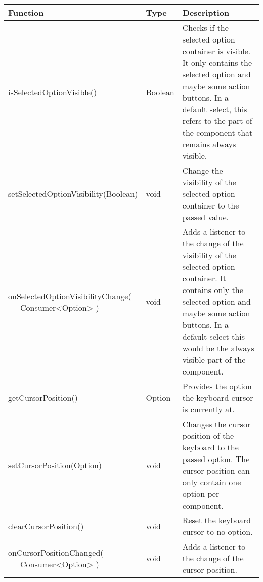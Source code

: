 \clearpage
\begin{table}[!htb] 
    \label{api:selectControllerReturn2}
    \scriptsize
    \setlength\extrarowheight{4pt}
    \begin{tabular}{ p{5cm} p{2.3cm} p{5.2cm} }
        \toprule[0.5pt]
        \textbf{Function}                    & \textbf{Type}          & \textbf{Description} \\
        \midrule    
        isSelectedOptionVisible()            & Boolean                & Checks if the selected option container is visible. 
                                                                        It only contains the selected option and maybe some action buttons.
        In a default select, this refers to the part of the component that remains always visible. \\
        setSelectedOptionVisibility(Boolean) & void                   & Change the visibility of the selected option container to the passed value. \\
        \tbbr{
            onSelectedOptionVisibilityChange( \\
                \ \ \ Consumer<Option>
            )}                               & void                   & Adds a listener to the change of the visibility of the selected option container. 
                                                                        It contains only the selected option and maybe some action buttons. 
                                                                        In a default select this would be the always visible part of the component. \\
        getCursorPosition()                  & Option                 & Provides the option the keyboard cursor is currently at. \\
        setCursorPosition(Option)            & void                   & Changes the cursor position of the keyboard to the passed option. 
                                                                        The cursor position can only contain one option per component. \\
        clearCursorPosition()                & void                   & Reset the keyboard cursor to no option. \\
        \tbbr{
            onCursorPositionChanged( \\
                \ \ \ Consumer<Option>
            )}                               & void                   & Adds a listener to the change of the cursor position. \\

\end{tabular}
\end{table}

